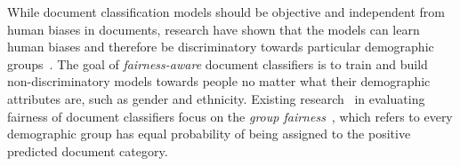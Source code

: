 
While document classification models should be objective and independent from human biases in documents, research have shown that the models can learn human biases and therefore be discriminatory towards particular demographic groups~\cite{dixon2018measuring,borkan2019nuanced,sun2019mitigating}.
The goal of \textit{fairness-aware} document classifiers is to train and build non-discriminatory models towards people no matter what their demographic attributes are, such as gender and ethnicity.
Existing research~\cite{dixon2018measuring,kiritchenko2018examining,park2018reducing,garg2019counterfactual,borkan2019nuanced} in evaluating fairness of document classifiers focus on the \textit{group fairness}~\cite{chouldechova2018frontiers}, which refers to every demographic group has equal probability of being assigned to the positive predicted document category.

